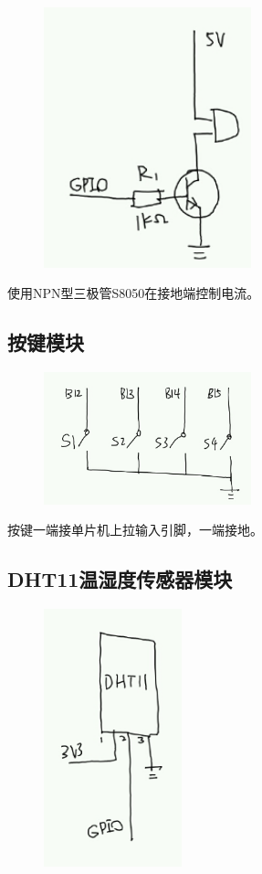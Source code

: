 \documentclass[a4paper,11pt,UTF8]{ctexart}
\newcommand{\bottomcaption}{%
\setlength{\abovecaptionskip}{6bp}%
\setlength{\belowcaptionskip}{6bp}%
\caption}
\newcommand{\xiaowuhao}{\fontsize{9bp}{9bp}\selectfont}   %
\begin{document}
\begin{figure}[!htbp]
    \centering
    \includegraphics[width=6cm]{image4.png}
    \bottomcaption{\xiaowuhao{蜂鸣器模块原理图}}
\end{figure}

使用NPN型三极管S8050在接地端控制电流。

\subsection{按键模块}

\begin{figure}[!htbp]
    \centering
    \includegraphics[width=6cm]{image5.png}
    \bottomcaption{\xiaowuhao{按键模块原理图}}
\end{figure}

按键一端接单片机上拉输入引脚，一端接地。

\subsection{DHT11温湿度传感器模块}

\begin{figure}[!htbp]
    \centering
    \includegraphics[width=4cm]{image6.png}
    \bottomcaption{\xiaowuhao{DHT11温湿度传感器模块原理图}}
\end{figure}
\end{document}
